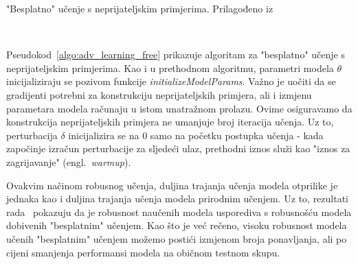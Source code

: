 \documentclass[times, utf8, zavrsni, numeric]{fer}
\newcommand{\pluseq}{\mathrel{+}=}
\begin{document}
\begin{algorithm}[H]
    \caption{"Besplatno" učenje s neprijateljskim primjerima. Prilagođeno iz~\cite{wong2020fast}}
    \label{algo:adv_learning_free}
    \begin{algorithmic}
        \\\hrulefill
                    \STATE{$gradAdv, grad \pluseq \nabla_{x_i, \theta} L(x_{i} + \delta,y_{i};\theta)$}
                \ENDFOR
            \ENDFOR
        \ENDFOR
    \end{algorithmic}
\end{algorithm}

Pseudokod~\ref{algo:adv_learning_free} prikazuje algoritam za "besplatno" učenje s neprijateljskim primjerima.
Kao i u prethodnom algoritmu, parametri modela $\theta$ inicijaliziraju se pozivom funkcije \textit{initializeModelParams}.
Važno je uočiti da se gradijenti potrebni za konstrukciju neprijateljskih primjera, ali i izmjenu parametara modela računaju u istom unatražnom prolazu.
Ovime osiguravamo da konstrukcija neprijateljskih primjera ne umanjuje broj iteracija učenja. 
Uz to, perturbacija $\delta$ inicijalizira se na 0 samo na početku postupka učenja - kada započinje izračun perturbacije za sljedeći ulaz, prethodni iznos služi kao "iznos za zagrijavanje" (engl.\ \textit{warmup}).

Ovakvim načinom robusnog učenja, duljina trajanja učenja modela otprilike je jednaka kao i duljina trajanja učenja modela prirodnim učenjem.
Uz to, rezultati rada~\cite{shafahi2019adversarial} pokazuju da je robusnost naučenih modela usporediva s robusnošću modela dobivenih "besplatnim" učenjem.
Kao što je već rečeno, visoku robusnost modela učenih "besplatnim" učenjem možemo postići izmjenom broja ponavljanja, ali po cijeni smanjenja performansi modela na običnom testnom skupu.
\end{document}
